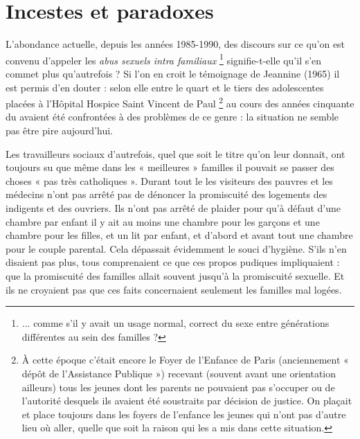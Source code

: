 
\chapter{Incestes et paradoxes}


 L'abondance actuelle, depuis les années 1985-1990, des discours sur ce qu'on est convenu d'appeler les \emph{abus sexuels intra familiaux}%
\footnote{... comme s'il y avait un usage normal, correct du sexe entre générations différentes au sein des familles ?} 
signifie-t-elle qu'il s'en commet plus qu'autrefois ? Si l'on en croit le témoignage de Jeannine  (1965) il est permis d'en douter : selon elle entre le quart et le tiers des adolescentes placées à l'Hôpital Hospice Saint Vincent de Paul%
\footnote{À cette époque c'était encore le Foyer de l'Enfance de Paris (anciennement « dépôt de l'Assistance Publique ») recevant (souvent avant une orientation ailleurs) tous les jeunes dont les parents ne pouvaient pas s'occuper ou de l'autorité desquels ils avaient été soustraits par décision de justice. On plaçait et place toujours dans les foyers de l'enfance les jeunes qui n'ont pas d'autre lieu où aller, quelle que soit la raison qui les a mis dans cette situation.} 
 au cours des années cinquante du  avaient été confrontées à des problèmes de ce genre : la situation ne semble pas être pire aujourd'hui. 

 Les travailleurs sociaux d'autrefois, quel que soit le titre qu'on leur donnait, ont toujours su que même dans les « meilleures » familles il pouvait se passer des choses « pas très catholiques ». Durant tout le  les visiteurs des pauvres et les médecins n'ont pas arrêté pas de dénoncer la promiscuité des logements des indigents et des ouvriers. Ils n'ont pas arrêté de plaider pour qu'à défaut d'une chambre par enfant il y ait au moins une chambre pour les garçons et une chambre pour les filles, et un lit par enfant, et d'abord et avant tout une chambre pour le couple parental. Cela dépassait évidemment le souci d'hygiène. S'ils n'en disaient pas plus, tous comprenaient ce que ces propos pudiques impliquaient : que la promiscuité des familles allait souvent jusqu'à la promiscuité sexuelle. Et ils ne croyaient pas que ces faits concernaient seulement les familles mal logées. 

